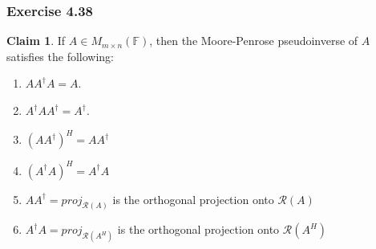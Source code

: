 \documentclass[letterpaper,12pt]{article}
\theoremstyle{definition}
\newtheorem{claim}[theorem]{Claim}
\begin{document}
\subsubsection*{Exercise 4.38}
\begin{claim}
	If $A \in M_{m \times n} (\mathbb{F})$, then the Moore-Penrose pseudoinverse of $A$ satisfies the following:
	\begin{enumerate}
	\item $ A A^{\dagger} A = A$.
	\item $A^{\dagger} A A^{\dagger} = A^{\dagger}$.
	\item $(AA^{\dagger})^H = A A^{\dagger}$
	\item $(A^{\dagger} A)^H = A^{\dagger} A$
	\item $AA^{\dagger} = proj_{\mathscr{R}(A)}$ is the orthogonal projection onto $\mathscr{R}(A)$
	\item $A^{\dagger} A =  proj_{\mathscr{R}(A^H)}$ is the orthogonal projection onto $\mathscr{R}(A^H)$
	\end{enumerate}
\end{claim}
\end{document}
